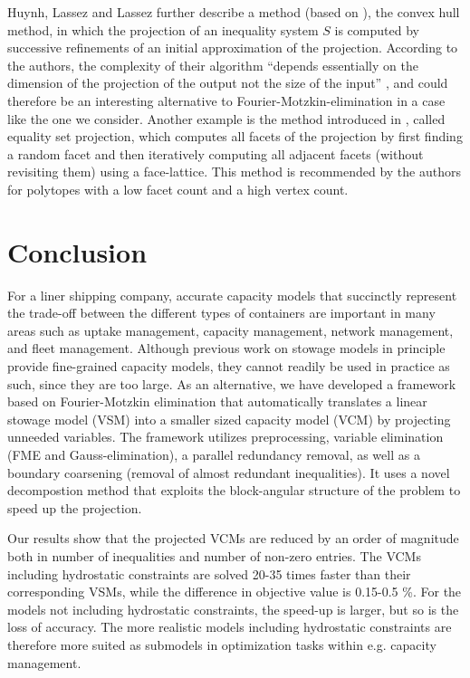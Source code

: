 \documentclass[citeauthoryear]{llncs}
\begin{document}
Huynh, Lassez and Lassez \cite{huynh92} further describe a method (based on \cite{lassezlassez}), the convex hull method, in which the projection of an inequality system $S$ is computed by successive refinements of an initial approximation of the projection. According to the authors, the complexity of their algorithm ``depends essentially on the dimension of the projection of the output not the size of the input'' \cite{huynh92}, and could therefore be an interesting alternative to Fourier-Motzkin-elimination in a case like the one we consider. Another example is the method introduced in \cite{jones04}, called equality set projection, which computes all facets of the projection by first finding a random facet and then iteratively computing all adjacent facets (without revisiting them) {using a face-lattice}. 
This method is recommended by the authors for polytopes with a low facet count and a high vertex count.

\section{Conclusion}\label{sec:concl}
For a liner shipping company, accurate capacity models that succinctly represent the trade-off between the different types of containers are important in many areas such as uptake management, capacity management, network management, and fleet management. Although previous work on stowage models in principle provide fine-grained capacity models, they cannot readily be used in practice as such, since they are too large.
As an alternative, we have developed a framework based on Fourier-Motzkin elimination that automatically translates a linear stowage model (VSM) into a smaller sized capacity model (VCM) by projecting unneeded variables. The framework utilizes preprocessing, variable elimination (FME and Gauss-elimination), a parallel redundancy removal, as well as a boundary coarsening (removal of almost redundant inequalities). It uses a novel decompostion method that exploits the block-angular structure of the problem to speed up the projection.

Our results show that the projected VCMs are reduced by an order of magnitude both in number of inequalities and number of non-zero entries. The VCMs including hydrostatic constraints are solved 20-35 times faster than their corresponding VSMs, while the difference in objective value is 0.15-0.5 \%. For the models not including hydrostatic constraints, the speed-up is larger, but so is the loss of accuracy. The more realistic models including hydrostatic constraints are therefore more suited as submodels in optimization tasks within e.g. capacity management. 
\end{document}
